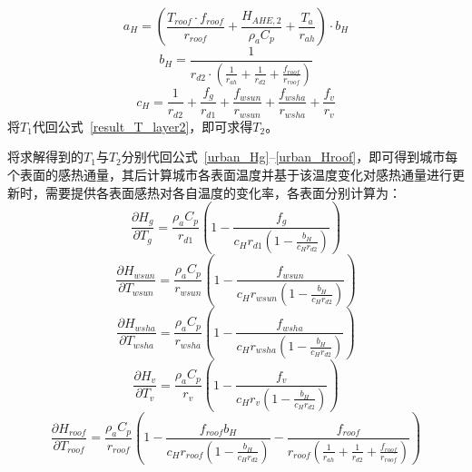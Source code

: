 %
\begin{equation}
    a_{H} = \left(\frac{T_{roof} \cdot f_{roof}}{r_{roof}} + \frac{H_{AHE,2}}{\rho _a C_p} + \frac{T_a}{r_{ah}}\right) \cdot b_{H}
\end{equation}
%
\begin{equation}
    b_{H} = \frac{1}{r_{d2} \cdot \left(\frac{1}{r_{ah}} + \frac{1}{r_{d2}} + \frac{f_{roof}}{r_{roof}} \right)}
\end{equation}
%
\begin{equation}
    c_{H} = \frac{1}{r_{d2}} + \frac{f_{g}}{r_{d1}} + \frac{f_{wsun}}{r_{wsun}} + \frac{f_{wsha}}{r_{wsha}} + \frac{f_v}{r_{v}}
\end{equation}
将$T_{1}$代回公式~\eqref{result_T_layer2}，即可求得$T_{2}$。

将求解得到的$T_{1}$与$T_{2}$分别代回公式~\eqref{urban_Hg}--\eqref{urban_Hroof}，即可得到城市每个表面的感热通量，其后计算城市各表面温度并基于该温度变化对感热通量进行更新时，需要提供各表面感热对各自温度的变化率，各表面分别计算为：
\begin{equation}
\frac{\partial H_{g}}{\partial T_{g}} = \frac{\rho _a C_p}{r_{d1}} \left(1-\frac{f_g}{c_{H} r_{d1} \left(1-\frac{b_H}{c_{H} r_{d2}}\right)}\right)
\end{equation}
%
\begin{equation}
\frac{\partial H_{wsun}}{\partial T_{wsun}} = \frac{\rho _a C_p}{r_{wsun}} \left(1-\frac{f_{wsun}}{c_{H} r_{wsun} \left(1-\frac{b_H}{c_{H} r_{d2}}\right)}\right)
\end{equation}
%
\begin{equation}
\frac{\partial H_{wsha}}{\partial T_{wsha}} = \frac{\rho _a C_p}{r_{wsha}} \left(1-\frac{f_{wsha}}{c_{H} r_{wsha} \left(1-\frac{b_H}{c_{H} r_{d2}}\right)}\right)
\end{equation}
%
\begin{equation}
\frac{\partial H_{v}}{\partial T_{v}} = \frac{\rho _a C_p}{r_{v}} \left(1-\frac{f_{v}}{c_{H} r_{v} \left(1-\frac{b_H}{c_{H} r_{d2}}\right)}\right)
\end{equation}
%
\begin{equation}
\frac{\partial H_{roof}}{\partial T_{roof}} = \frac{\rho _a C_p}{r_{roof}} \left(1-\frac{f_{roof} b_{H}}{c_{H} r_{roof} \left(1-\frac{b_H}{c_{H} r_{d2}}\right)}-\frac{f_{roof}}{r_{roof}\left(\frac{1}{r_{ah}}+\frac{1}{r_{d2}}+\frac{f_{roof}}{r_{roof}}\right)}\right)
\end{equation}

